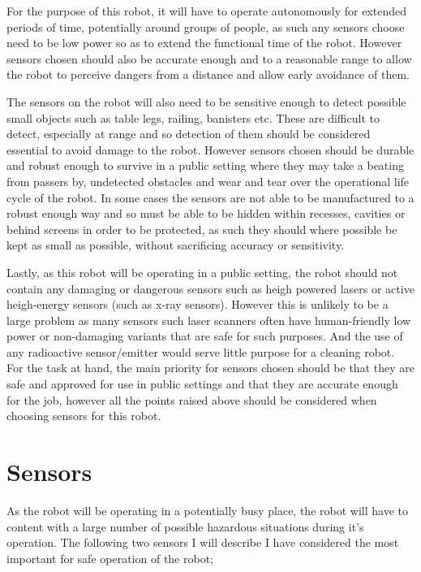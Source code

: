 \documentclass[10pt]{article}
\begin{document}
    For the purpose of this robot, it will have to operate autonomously for extended periods of time, potentially around groups of people, as such any sensors choose need to be low power so as to extend the functional time of the robot. However sensors chosen should also be accurate enough and to a reasonable range to allow the robot to perceive dangers from a distance and allow early avoidance of them. 

    The sensors on the robot will also need to be sensitive enough to detect possible small objects such as table legs, railing, banisters etc. These are difficult to detect, especially at range and so detection of them should be considered essential to avoid damage to the robot. However sensors chosen should be durable and robust enough to survive in a public setting where they may take a beating from passers by, undetected obstacles and wear and tear over the operational life cycle of the robot. In some cases the sensors are not able to be manufactured to a robust enough way and so must be able to be hidden within recesses, cavities or behind screens in order to be protected, as such they should where possible be kept as small as possible, without sacrificing accuracy or sensitivity. 

    Lastly, as this robot will be operating in a public setting, the robot should not contain any damaging or dangerous sensors such as heigh powered lasers or active heigh-energy sensors (such as x-ray sensors). However this is unlikely to be a large problem as many sensors such laser scanners often have human-friendly low power or non-damaging variants that are safe for such purposes. And the use of any radioactive sensor/emitter would serve little purpose for a cleaning robot.\\

    For the task at hand, the main priority for sensors chosen should be that they are safe and approved for use in public settings and that they are accurate enough for the job, however all the points raised above should be considered when choosing sensors for this robot.

    \newpage
   
   \section{Sensors}
    As the robot will be operating in a potentially busy place, the robot will have to content with a large number of possible hazardous situations during it's operation. The following two sensors I will describe I have considered the most important for safe operation of the robot;
\end{document}
